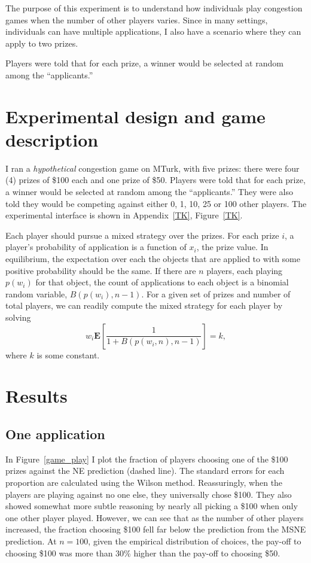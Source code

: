 \documentclass[11pt]{article}
\begin{document}
The purpose of this experiment is to understand how individuals play congestion games when the number of other players varies. 
Since in many settings, individuals can have multiple applications, I also have a scenario where they can apply to two prizes. 


Players were told that for each prize, a winner would be selected at random among the ``applicants.''  

\cite{horton2011online} 

\section{Experimental design and game description} 
I ran a \emph{hypothetical} congestion game on MTurk, with five prizes: 
there were four (4) prizes of \$100 each and one prize of \$50. 
Players were told that for each prize, a winner would be selected at random among the ``applicants.''  
They were also told they would be competing against either 0, 1, 10, 25 or 100 other players. 
The experimental interface is shown in Appendix~\ref{TK}, Figure~\ref{TK}. 

Each player should pursue a mixed strategy over the prizes. 
For each prize $i$, a player's probability of application is a function of $x_i$, the prize value. 
In equilibrium, the expectation over each the objects that are applied to with some positive probability should be the same. 
If there are $n$ players, each playing $p(w_i)$ for that object, the count of applications to each object is a binomial random variable, $B(p(w_i), n - 1)$.
For a given set of prizes and number of total players, we can readily compute the mixed strategy for each player by solving 
\begin{equation}
w_i \mathbf{E}\left[\frac{1}{1 + B(p(w_i, n), n - 1)}\right] = k,
\end{equation} 
where $k$ is some constant. 

\section{Results} 

\subsection{One application} 
In Figure~\ref{game_play} I plot the fraction of players choosing one of the \$100 prizes against the NE prediction (dashed line). 
The standard errors for each proportion are calculated using the Wilson method. 
Reassuringly, when the players are playing against no one else, they universally chose \$100. 
They also showed somewhat more subtle reasoning by nearly all picking a \$100 when only one other player played. 
However, we can see that as the number of other players increased, the fraction choosing \$100 fell far below the prediction from the MSNE prediction. 
At $n = 100$, given the empirical distribution of choices, the pay-off to choosing \$100 was more than 30\% higher than the pay-off to choosing \$50. 
\end{document}
